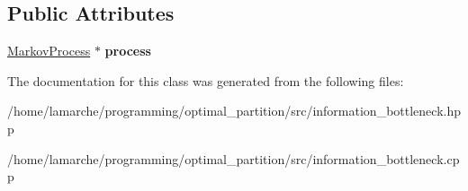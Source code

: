 \subsection*{Public Attributes}
\begin{DoxyCompactItemize}
\item 
\hypertarget{classInformationBottleneck_a0d288b82a5d34dff1210d54383ce5997}{\hyperlink{classMarkovProcess}{Markov\-Process} $\ast$ {\bfseries process}}\label{classInformationBottleneck_a0d288b82a5d34dff1210d54383ce5997}

\end{DoxyCompactItemize}


The documentation for this class was generated from the following files\-:\begin{DoxyCompactItemize}
\item 
/home/lamarche/programming/optimal\-\_\-partition/src/information\-\_\-bottleneck.\-hpp\item 
/home/lamarche/programming/optimal\-\_\-partition/src/information\-\_\-bottleneck.\-cpp\end{DoxyCompactItemize}
